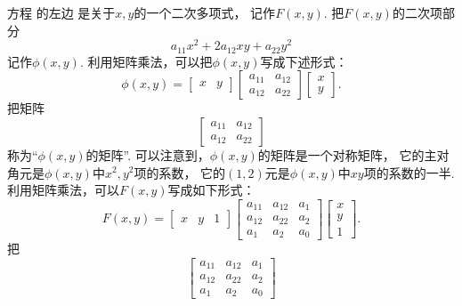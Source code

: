 方程  的左边
是关于\(x,y\)的一个二次多项式，
记作\(F(x,y)\).
把\(F(x,y)\)的二次项部分\begin{equation}
	a_{11} x^2 + 2 a_{12} x y + a_{22} y^2
\end{equation}
记作\(\phi(x,y)\).
利用矩阵乘法，可以把\(\phi(x,y)\)写成下述形式：\begin{equation}
	\phi(x,y)
	= \begin{bmatrix}
		x & y
	\end{bmatrix}
	\begin{bmatrix}
		a_{11} & a_{12} \\
		a_{12} & a_{22}
	\end{bmatrix}
	\begin{bmatrix}
		x \\ y
	\end{bmatrix}.
\end{equation}
把矩阵\begin{equation}
	\begin{bmatrix}
		a_{11} & a_{12} \\
		a_{12} & a_{22}
	\end{bmatrix}
\end{equation}
称为“\(\phi(x,y)\)的矩阵”.
可以注意到，\(\phi(x,y)\)的矩阵是一个对称矩阵，
它的主对角元是\(\phi(x,y)\)中\(x^2,y^2\)项的系数，
它的\((1,2)\)元是\(\phi(x,y)\)中\(xy\)项的系数的一半.
利用矩阵乘法，可以\(F(x,y)\)写成如下形式：\begin{equation}
	F(x,y)
	= \begin{bmatrix}
		x & y & 1
	\end{bmatrix}
	\begin{bmatrix}
		a_{11} & a_{12} & a_1 \\
		a_{12} & a_{22} & a_2 \\
		a_1 & a_2 & a_0
	\end{bmatrix}
	\begin{bmatrix}
		x \\ y \\ 1
	\end{bmatrix}.
\end{equation}
把\begin{equation}
	\begin{bmatrix}
		a_{11} & a_{12} & a_1 \\
		a_{12} & a_{22} & a_2 \\
		a_1 & a_2 & a_0
	\end{bmatrix}
\end{equation}
